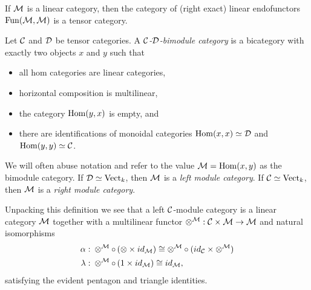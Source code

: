 \documentclass{amsart}
\begin{document}
\begin{example}
	If $\mathcal M$ is a linear category, then the category of (right exact) linear endofunctors $\operatorname{Fun}(\mathcal M, \mathcal M)$ is a tensor category. 
\end{example}

\begin{definition}
	Let $\mathcal C$ and $\mathcal D$ be tensor categories. A {\em $\mathcal C$-$\mathcal D$-bimodule category} is a bicategory with exactly two objects $x$ and $y$ such that 
	\begin{itemize}
		\item all hom categories are linear categories, 
		\item horizontal composition is multilinear,
		\item the category $\operatorname{Hom}(y,x)$ is empty, and
		\item there are identifications of monoidal categories $\operatorname{Hom}(x,x) \simeq \mathcal D$ and $\operatorname{Hom}(y,y) \simeq \mathcal C$.
	\end{itemize} 
	We will often abuse notation and refer to the value $\mathcal M = \operatorname{Hom}(x,y)$ as the bimodule category. If $\mathcal D \simeq \mathrm{Vect}_k$, then $\mathcal M$ is a {\em left module category}. If $\mathcal C \simeq \mathrm{Vect}_k$, then $\mathcal M$ is a {\em right module category}.
\end{definition}
	
Unpacking this definition we see that a left $\mathcal C$-module category is a linear category $\mathcal M$ together with a multilinear functor $\otimes^{\mathcal M}: \mathcal C \times \mathcal M \to \mathcal M$ and natural isomorphisms
	\begin{align*}
		\alpha: & \;    \otimes^{\mathcal M} \circ \, (\otimes \times id_{\mathcal M}) \cong  \otimes^{\mathcal M} \circ (id_{\mathcal C} \times \otimes^{\mathcal M}) \\
		\lambda: & \; \otimes^{\mathcal M} \circ \, (1 \times id_{\mathcal M}) \cong id_{\mathcal M},
	\end{align*}
	satisfying the evident pentagon and triangle identities. 
\end{document}
